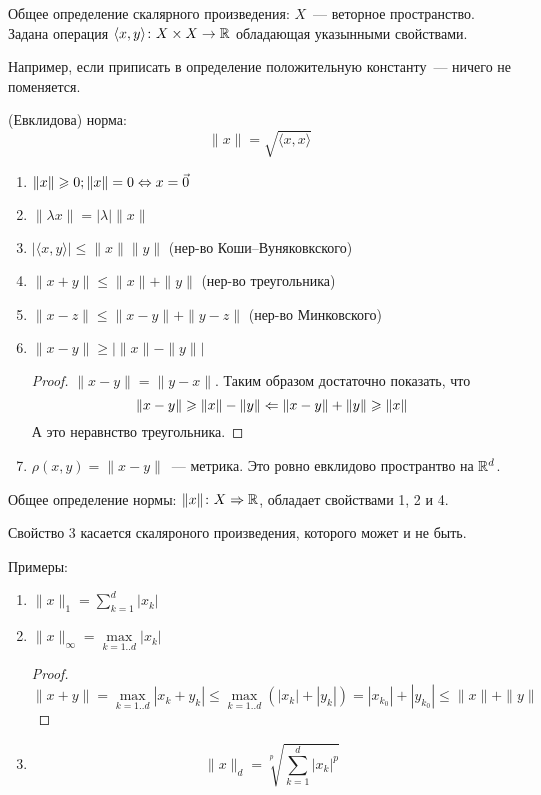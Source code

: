 \begin{Def}
Общее определение скалярного произведения: $X$~--- веторное пространство. Задана операция $\langle x,y\rangle\colon X \times X \rightarrow \mathbb{R}$ обладающая указынными свойствами.
\end{Def}
Например, если приписать в определение положительную константу~--- ничего не поменяется.

\begin{Def}
(Евклидова) норма:
$$\|x\| = \sqrt{\langle x, x\rangle}$$
\end{Def}
\begin{enumerate}
\item $\|x\| \geqslant 0; \|x\| = 0 \Leftrightarrow x = \vec 0$
\item $\|\lambda x\| = |\lambda| \|x\|$
\item $|\langle x,y\rangle| \leqslant \|x\|\|y\|$ (нер-во Коши--Вуняковкского)
\item $\|x + y\| \leqslant \|x\| + \|y\|$ (нер-во треугольника)
\item $\|x - z\| \leqslant \|x - y\| + \|y - z\|$ (нер-во Минковского)
\item $\|x - y\| \geqslant \left|\|x\| - \|y\|\right|$
\begin{proof}
$\|x - y\| = \|y - x\|$. Таким образом достаточно показать, что 
$$\|x - y\| \geqslant \|x\| - \|y\| \Leftarrow \|x - y\| + \|y\| \geqslant \|x\|$$
А это неравнство треугольника.
\end{proof}
\item $\rho(x, y) = \|x - y\|$~--- метрика. Это ровно евклидово пространтво на $\mathbb{R}^d$.
\end{enumerate}

\begin{Def}
Общее определение нормы: $\|x\|\colon X \Rightarrow \mathbb{R}$, обладает свойствами 1, 2 и 4.
\end{Def}
Свойство 3 касается скаляроного произведения, которого может и не быть.

Примеры:~%
\begin{enumerate}
\item $\|x\|_1 = \sum\limits_{k=1}^d |x_k|$
\item $\|x\|_\infty = \max\limits_{k=1..d} |x_k|$
\begin{proof}
$$\|x + y\| = \max_{k=1..d} |x_k + y_k| \leqslant \max_{k=1..d} (|x_k| + |y_k|) = |x_{k_0}| + |y_{k_0}| \leqslant \|x\| + \|y\|$$
\end{proof}
\item $$\|x\|_d = \sqrt[p]{\sum\limits_{k=1}^d |x_k|^p}$$
\end{enumerate}